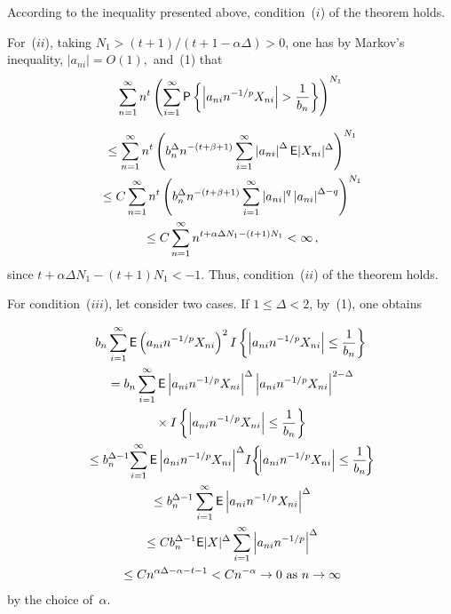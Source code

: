 \begin{multicols}{2}
According to the inequality presented above, condition~($i$) of the theorem holds.

For~($ii$), taking $N_1>(t+1)/(t+1 -\alpha\Delta)>0$, one has by Markov's inequality, 
$|a_{ni}|=O(1),$ and~(1)
that
\begin{multline*}
\sum\limits_{n=1}^\infty n^t \left(
\sum\limits_{i=1}^\infty {\sf P}\left\{\left|a_{ni}n^{-1/p}X_{ni}\right|>\fr{1}{b_n}\right\} \right)^{N_1}
\end{multline*}

\noindent
\begin{multline*}
{}\le \sum\limits_{n=1}^\infty n^t \left( b_n^{\Delta} n^{-(t+\beta+1)} 
\sum\limits_{i=1}^\infty \left|a_{ni}\right|^{\Delta}
{\sf E}|X_{ni}|^{\Delta} \right)^{N_1}\\
{}\le C\sum\limits_{n=1}^\infty n^t \left( b_n^{\Delta} n^{-(t+\beta + 1)} 
\sum\limits_{i=1}^\infty \left|a_{ni}\right|^{q} \left|a_{ni}\right|^{\Delta-q} \right)^{N_1} \\
{}\le C \sum\limits_{n=1}^\infty n^{t + \alpha \Delta N_1 -(t+1)N_1} <\infty\,,
\end{multline*}
since  $t +\alpha \Delta N_1 -(t+1)N_1< -1$. Thus, condition~($ii$) of the theorem holds.

For condition~($iii$), let consider two cases. If $1\le \Delta<2$, by~(1), one obtains

\noindent
\begin{multline*}
b_n \sum\limits_{i=1}^\infty {\sf E}\left(a_{ni}n^{-1/p} X_{ni}\right)^2 
I\left\{\left|a_{ni}n^{-1/p} X_{ni}\right|\le \displaystyle\frac{\displaystyle 1\mathstrut}{\displaystyle b_n\mathstrut}\right\}\\
{}=b_n \sum\limits_{i=1}^\infty {\sf E}\left|a_{ni}n^{-1/p} X_{ni}\right|^{\Delta} 
\left|a_{ni}n^{-1/p} X_{ni}\right|^{2-\Delta}\\
{}\times I\left\{\left|a_{ni}n^{-1/p} X_{ni}\right|\le \displaystyle\frac{\displaystyle 1\mathstrut}{\displaystyle b_n\mathstrut}\right\}\\
\hspace*{-0.36795pt}{}\le b_n^{\Delta-1}\!\sum\limits_{i=1}^\infty {\sf E}\left|a_{ni}n^{-1/p} X_{ni}\right|^{\Delta} 
\!I\!\left\{\!\left|a_{ni}n^{-1/p}X_{ni}\right|\le \displaystyle\frac{\displaystyle 1\mathstrut}{\displaystyle b_n\mathstrut}\!\right\} \\
{}\le b_n^{\Delta-1}\sum\limits_{i=1}^\infty {\sf E}\left|a_{ni}n^{-1/p} X_{ni}\right|^{\Delta} \\
{}\le C b_n^{\Delta-1}{\sf E}|X|^{\Delta} \sum\limits_{i=1}^\infty \left|a_{ni}n^{-1/p}\right|^{\Delta} \\
{}\le C n^{\alpha\Delta -\alpha -t -1} < Cn^{-\alpha} \to 0 \mbox{ as } n\to \infty
\end{multline*}
by the choice of~$\alpha$.


\end{multicols}
